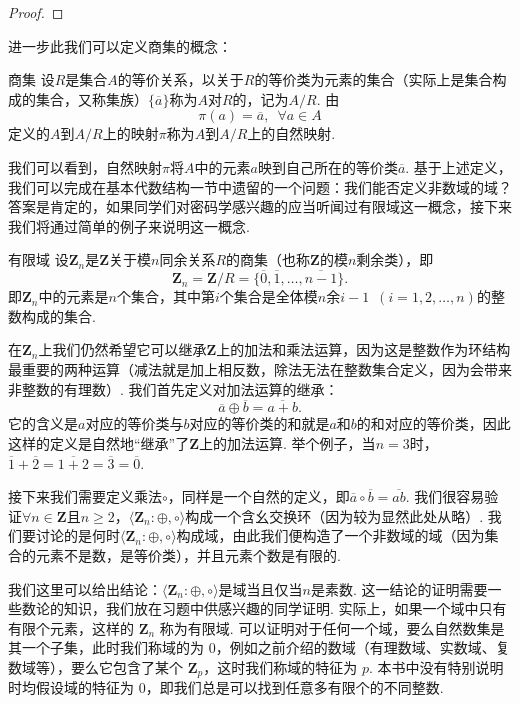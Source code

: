 \begin{proof}

\end{proof}

进一步此我们可以定义商集的概念：
\begin{definition}{商集}{} 
    设$R$是集合$A$的等价关系，以关于$R$的等价类为元素的集合（实际上是集合构成的集合，又称集族）$\{\overline{a}\}$称为$A$对$R$的，记为$A/R$. 由
    \[\pi(a) = \overline{a}, \enspace \forall a\in A\]
    定义的$A$到$A/R$上的映射$\pi$称为$A$到$A/R$上的自然映射.
\end{definition}
我们可以看到，自然映射$\pi$将$A$中的元素$a$映到自己所在的等价类$\overline{a}$. 基于上述定义，我们可以完成在基本代数结构一节中遗留的一个问题：我们能否定义非数域的域？答案是肯定的，如果同学们对密码学感兴趣的应当听闻过有限域这一概念，接下来我们将通过简单的例子来说明这一概念.

\begin{example}{}{有限域}
    设$\mathbf{Z}_n$是$\mathbf{Z}$关于模$n$同余关系$R$的商集（也称$\mathbf{Z}$的模$n$剩余类），即
    \[\mathbf{Z}_n=\mathbf{Z}/R=\{\overline{0},\overline{1},\ldots,\overline{n-1}\}.\]
    即$\mathbf{Z}_n$中的元素是$n$个集合，其中第$i$个集合是全体模$n$余$i-1\enspace(i=1,2,\ldots,n)$的整数构成的集合.

    在$\mathbf{Z}_n$上我们仍然希望它可以继承$\mathbf{Z}$上的加法和乘法运算，因为这是整数作为环结构最重要的两种运算（减法就是加上相反数，除法无法在整数集合定义，因为会带来非整数的有理数）. 我们首先定义对加法运算的继承：
    \[\overline{a}\oplus\overline{b}=\overline{a+b}.\]
    它的含义是$a$对应的等价类与$b$对应的等价类的和就是$a$和$b$的和对应的等价类，因此这样的定义是自然地``继承''了$\mathbf{Z}$上的加法运算. 举个例子，当$n=3$时，$\overline{1}+\overline{2}=\overline{1+2}=\overline{3}=\overline{0}$.

    接下来我们需要定义乘法$\circ$，同样是一个自然的定义，即$\overline{a}\circ\overline{b}=\overline{ab}$. 我们很容易验证$\forall n\in\mathbf{Z}$且$n\geqslant 2$，$\langle \mathbf{Z}_n\colon\oplus,\circ\rangle$构成一个含幺交换环（因为较为显然此处从略）. 我们要讨论的是何时$\langle \mathbf{Z}_n\colon\oplus,\circ\rangle$构成域，由此我们便构造了一个非数域的域（因为集合的元素不是数，是等价类），并且元素个数是有限的.

    我们这里可以给出结论：$\langle \mathbf{Z}_n\colon\oplus,\circ\rangle$是域当且仅当$n$是素数. 这一结论的证明需要一些数论的知识，我们放在习题中供感兴趣的同学证明. 实际上，如果一个域中只有有限个元素，这样的 $\mathbf{Z}_n$ 称为有限域. 可以证明对于任何一个域，要么自然数集是其一个子集，此时我们称域的为 $0$，例如之前介绍的数域（有理数域、实数域、复数域等），要么它包含了某个 $\mathbf{Z}_p$，这时我们称域的特征为 $p$. 本书中没有特别说明时均假设域的特征为 $0$，即我们总是可以找到任意多有限个的不同整数.
\end{example}

